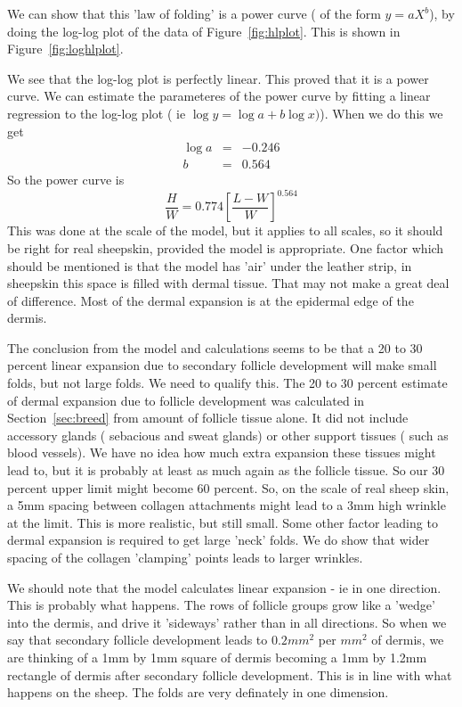 \documentclass[titlepage]{article}  %
\begin{document}
We can show that this 'law of folding' is a power curve ( of the form $y = aX^{b}$), by doing the log-log plot of the data of Figure~\ref{fig:hlplot}. This is shown in Figure~\ref{fig:loghlplot}.

We see that the log-log plot is perfectly linear. This proved that it is a power curve.  We can estimate the parameteres of the power curve by fitting a linear regression to the log-log plot ( ie $\log{y} = \log{a} + b \log{x)}$). When we do this we get
\begin{eqnarray*}
\log{a} & = & -0.246 \\
b & = & 0.564
\end{eqnarray*}
 So the power curve is
\begin{displaymath}
\frac{H}{W} = 0.774 \left[\frac{L-W}{W}\right]^{0.564}
\end{displaymath}
 This was done at the scale of the model, but it applies to all scales, so it should be right for real sheepskin, provided the model is appropriate. One factor which should be mentioned is that the model has 'air' under the leather strip, in sheepskin this space is filled with dermal tissue. That may not make a great deal of difference. Most of the dermal expansion is at the epidermal edge of the dermis.

The conclusion from the model and calculations seems to be that a 20  to 30 percent linear expansion due to secondary follicle development will make small folds, but not large folds. We need to qualify this. The 20 to 30 percent estimate of dermal expansion due to follicle development was calculated in Section~\ref{sec:breed} from amount of follicle tissue alone. It did not include accessory glands ( sebacious and sweat glands) or other support tissues ( such as blood vessels). We have no idea how much extra expansion these tissues might lead to, but it is probably at least as much again as the follicle tissue. So our 30 percent upper limit might become 60 percent. So, on the scale of real sheep skin, a 5mm spacing between collagen attachments might lead to a 3mm high wrinkle at the limit. This is more realistic, but still small. Some other factor leading to dermal expansion is required to get large 'neck' folds.  We do show that wider spacing of the collagen 'clamping' points leads to larger wrinkles.

We should note that the model calculates linear expansion - ie in one direction. This is probably what happens. The rows of follicle groups grow like a 'wedge' into the dermis, and drive it 'sideways' rather than in all directions. So when we say that secondary follicle development leads to $0.2 mm^{2}$ per $mm^{2}$ of dermis, we are thinking of a 1mm by 1mm square of dermis becoming a 1mm by 1.2mm rectangle of dermis after secondary follicle development. This is in line with what happens on the sheep. The folds are very definately in one dimension.
\end{document}
